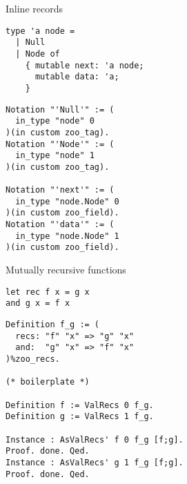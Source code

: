 \begin{frame}[fragile]{Inline records}
\begin{minipage}{0.49\textwidth}
  \begin{verbatim}
type 'a node =
  | Null
  | Node of
    { mutable next: 'a node;
      mutable data: 'a;
    }
  \end{verbatim}
\end{minipage}
\begin{minipage}{0.5\textwidth}
  \begin{verbatim}
Notation "'Null'" := (
  in_type "node" 0
)(in custom zoo_tag).
Notation "'Node'" := (
  in_type "node" 1
)(in custom zoo_tag).

Notation "'next'" := (
  in_type "node.Node" 0
)(in custom zoo_field).
Notation "'data'" := (
  in_type "node.Node" 1
)(in custom zoo_field).
  \end{verbatim}
\end{minipage}
\end{frame}

\begin{frame}[fragile]{Mutually recursive functions}
\begin{minipage}{0.49\textwidth}
  \begin{verbatim}
let rec f x = g x
and g x = f x
  \end{verbatim}
\end{minipage}
\begin{minipage}{0.5\textwidth}
  \begin{verbatim}
Definition f_g := (
  recs: "f" "x" => "g" "x"
  and:  "g" "x" => "f" "x"
)%zoo_recs.

(* boilerplate *)

Definition f := ValRecs 0 f_g.
Definition g := ValRecs 1 f_g.

Instance : AsValRecs' f 0 f_g [f;g].
Proof. done. Qed.
Instance : AsValRecs' g 1 f_g [f;g].
Proof. done. Qed.
  \end{verbatim}
\end{minipage}
\end{frame}

